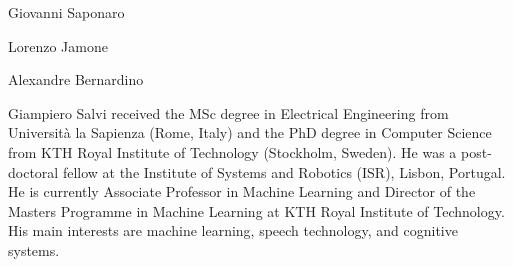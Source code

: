 \begin{IEEEbiography}{Giovanni Saponaro}
\end{IEEEbiography}

\begin{IEEEbiography}{Lorenzo Jamone}
\end{IEEEbiography}

\begin{IEEEbiography}{Alexandre Bernardino}
\end{IEEEbiography}

\begin{IEEEbiography}{Giampiero Salvi}
received the MSc degree in Electrical Engineering from Università la Sapienza (Rome, Italy) and the PhD degree in Computer Science from KTH Royal Institute of Technology (Stockholm, Sweden). He was a post-doctoral fellow at the Institute of Systems and Robotics (ISR), Lisbon, Portugal. He is currently Associate Professor in Machine Learning and Director of the Masters Programme in Machine Learning at KTH Royal Institute of Technology. His main interests are machine learning, speech technology, and cognitive systems.
\end{IEEEbiography}
